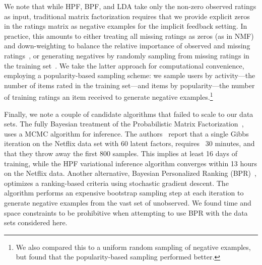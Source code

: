 We note that while HPF, BPF, and LDA take only the non-zero observed
ratings as input, traditional matrix factorization requires that we
provide explicit zeros in the ratings matrix as negative examples for
the implicit feedback setting. In practice, this amounts to either
treating all missing ratings as zeros (as in NMF) and down-weighting
to balance the relative importance of observed and missing
ratings~\cite{Hu:2008p9402}, or generating negatives by randomly
sampling from missing ratings in the training
set~\cite{Gantner:2012p9364,Dror:2012a,Paquet:2013p9197}.  We take the
latter approach for computational convenience, employing a
popularity-based sampling scheme: we sample users by activity---the
number of items rated in the training set---and items by
popularity---the number of training ratings an item received to
generate negative examples.\footnote{We also compared this to a
  uniform random sampling of negative examples, but found that the
  popularity-based sampling performed better.} 

Finally, we note a couple of candidate algorithms that failed to scale
to our data sets. The fully Bayesian treatment of the Probabilistic
Matrix Factorization~\cite{Salakhutdinov:2008}, uses a MCMC algorithm
for inference. The authors~\cite{Salakhutdinov:2008} report that a
single Gibbs iteration on the Netflix data set with 60 latent factors,
requires ~30 minutes, and that they throw away the first 800
samples. This implies at least 16 days of training, while the HPF
variational inference algorithm converges within 13 hours on the
Netflix data. Another alternative, Bayesian Personalized Ranking
(BPR)~\cite{Rendle:2009p9243,Gantner:2012p9364}, optimizes a
ranking-based criteria using stochastic gradient descent. The
algorithm performs an expensive bootstrap sampling step at each
iteration to generate negative examples from the vast set of
unobserved. We found time and space constraints to be prohibitive when
attempting to use BPR with the data sets considered here.


